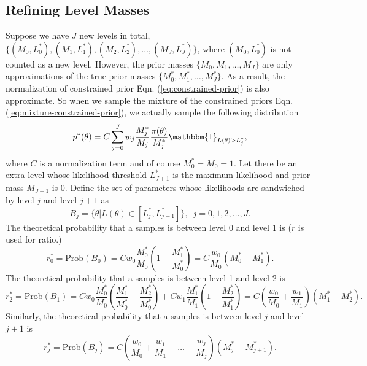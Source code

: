 \documentclass[letterpaper, preprint]{aastex}
\begin{document}
\subsection{Refining Level Masses}
Suppose we have $J$ new levels in total, $\{(M_0, L_0^*),(M_1,L_1^*),(M_2,L_2^*), \ldots,(M_J,L_J^*)\}$, where $(M_0, L_0^*)$ is not counted as a new level. However, the prior masses $\{M_0,M_1,\dots,M_J\}$ are only approximations of the true prior masses $\{M^*_0,M^*_1,\dots,M^*_J\}$. As a result, the normalization of constrained prior Eqn. (\ref{eq:constrained-prior}) is also approximate. So when we sample the mixture of the constrained priors Eqn. (\ref{eq:mixture-constrained-prior}), we actually sample the following distribution
\begin{equation}
p^*(\theta)=C\sum_{j=0}^J w_j\frac{M^*_j}{M_j}\frac{\pi(\theta)}{M^*_j}\mathbbm{1}_{L(\theta)>L_j^*},
\label{eq:true-mixture-constrained-prior}
\end{equation}
where $C$ is a normalization term and of course $M^*_0 = M_0 = 1$. Let there be an extra level whose likelihood threshold $L^*_{J+1}$ is the maximum likelihood and prior mass $M_{J+1}$ is 0. Define the set of parameters whose likelihoods are sandwiched by level $j$ and level $j+1$ as
\begin{equation}
B_j = \{\theta|L(\theta)\in[L_j^*,L_{j+1}^*]\},\,\,\,j=0,1,2,\dots,J.
\end{equation}
The theoretical probability that a samples is between level 0 and level 1 is ($r$ is used for ratio.)
\begin{equation}
r^*_0 = \mathrm{Prob}(B_0)=Cw_0\frac{M^*_0}{M_0}\left(1-\frac{M^*_1}{M^*_0}\right) = C\frac{w_0}{M_0}(M^*_0-M^*_1).
\end{equation}
The theoretical probability that a samples is between level 1 and level 2 is
\begin{equation}
r^*_2=\mathrm{Prob}(B_1)=Cw_0\frac{M^*_0}{M_0}\left(\frac{M^*_1}{M^*_0}-\frac{M^*_2}{M^*_0}\right)+Cw_1\frac{M^*_1}{M_1}\left(1-\frac{M^*_2}{M^*_1}\right) = C\left(\frac{w_0}{M_0}+\frac{w_1}{M_1}\right)(M^*_1-M^*_2).
\end{equation}
Similarly, the theoretical  probability that a samples is between level $j$ and level $j+1$ is
\begin{equation}
r^*_j= \mathrm{Prob}(B_j)=C\left(\frac{w_0}{M_0}+\frac{w_1}{M_1}+\ldots+\frac{w_j}{M_j}\right)(M^*_j-M^*_{j+1}).
\label{eq:theoretical-percentage}
\end{equation}
\end{document}
